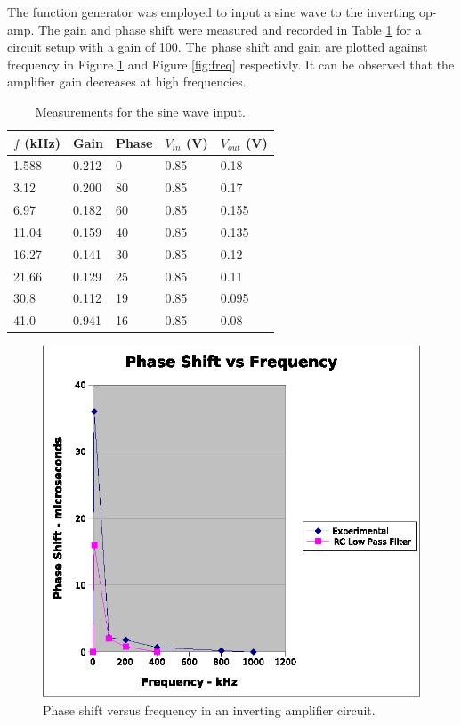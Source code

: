 \documentclass[11pt,onecolumn]{article}
\begin{document}
The function generator was employed to input a sine wave to the inverting op-amp. The gain and phase shift were measured and recorded in Table \ref{tab:Q3} for a circuit setup with a gain of 100. The phase shift and gain are plotted against frequency in Figure \ref{fig:phase} and Figure \ref{fig:freq} respectivly. It can be observed that the amplifier gain decreases at high frequencies.
\begin{table}
\center
\begin{tabular}{|lllll|}
\hline
$f$ (kHz)& Gain	& Phase	& $V_{in}$ (V)	& $V_{out}$ (V) \\
\hline
1.588	& 0.212	& 0	& 0.85		& 0.18 \\
3.12	& 0.200	& 80	& 0.85		& 0.17 \\
6.97	& 0.182	& 60	& 0.85		& 0.155 \\
11.04	& 0.159	& 40	& 0.85		& 0.135 \\
16.27	& 0.141	& 30	& 0.85		& 0.12 \\
21.66	& 0.129	& 25	& 0.85		& 0.11 \\
30.8	& 0.112	& 19	& 0.85		& 0.095 \\
41.0	& 0.941	& 16	& 0.85		& 0.08 \\
\hline
\end{tabular}
\caption{Measurements for the sine wave input.}\label{tab:Q3}
\end{table}
%
%
\begin{figure}
\center
\includegraphics{phase.eps}
\caption{Phase shift versus frequency in an inverting amplifier circuit.}\label{fig:phase}
\end{figure}
\end{document}
